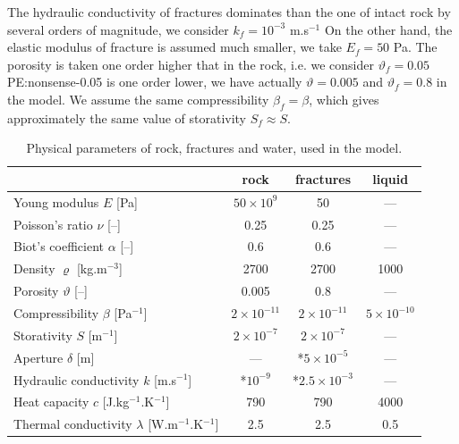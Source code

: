 \documentclass{article}
\newcommand{\todo}[1]{{\color{red}#1}}
\begin{document}
The hydraulic conductivity of fractures dominates than the one of intact rock by several orders of magnitude, we consider $k_f=10^{-3}$ m.s${}^{-1}$
On the other hand, the elastic modulus of fracture is assumed much smaller, we take $E_f=50$ Pa.
The porosity is taken one order higher that in the rock, i.e. we consider $\vartheta_f=0.05$ \todo{PE:nonsense-0.05 is one order lower,
we have actually $\vartheta=0.005$ and $\vartheta_f=0.8$ in the model}.
We assume the same compressibility $\beta_f=\beta$, which gives approximately the same value of storativity $S_f\approx S$.

\begin{table}
\centering
\begin{tabular}{|l|c|c|c|}
\hline
 & rock & fractures & liquid\\\hline
Young modulus $E$ [Pa] & $50\times10^9$ & 50 & --- \\
Poisson's ratio $\nu$ [--] & 0.25 & 0.25 & --- \\
Biot's coefficient $\alpha$ [--] & 0.6 & 0.6 & --- \\
\hline
Density $\varrho$ [kg.m${}^{-3}$] & 2700 & 2700 & 1000 \\
Porosity $\vartheta$ [--] & 0.005 & 0.8 & --- \\
Compressibility $\beta$ [Pa${}^{-1}$] & $2\times10^{-11}$ & $2\times10^{-11}$ & $5\times10^{-10}$ \\
Storativity $S$ [m${}^{-1}$] & $2\times10^{-7}$ & $2\times10^{-7}$ & --- \\
Aperture $\delta$ [m] & --- & *$5\times10^{-5}$ & --- \\
Hydraulic conductivity $k$ [m.s${}^{-1}$] & *$10^{-9}$ & *$2.5\times10^{-3}$ & ---\\
\hline
Heat capacity $c$ [J.kg${}^{-1}$.K${}^{-1}$] & 790 & 790 & 4000 \\
Thermal conductivity $\lambda$ [W.m${}^{-1}$.K${}^{-1}$] & 2.5 & 2.5 & 0.5 \\
\hline
\end{tabular}
\caption{Physical parameters of rock, fractures and water, used in the model.}
\label{tab:params}
\end{table}




\end{document}
